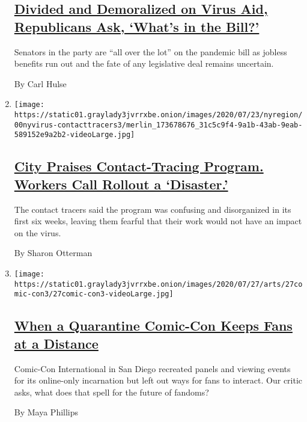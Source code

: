 \begin{enumerate}
{  \subsection{\texorpdfstring{\href{/2020/07/29/us/politics/republicans-congress-virus-aid.html}{Divided
  and Demoralized on Virus Aid, Republicans Ask, `What's in the
  Bill?'}}{Divided and Demoralized on Virus Aid, Republicans Ask, `What's in the Bill?'}}\label{divided-and-demoralized-on-virus-aid-republicans-ask-whats-in-the-bill}}

  Senators in the party are ``all over the lot'' on the pandemic bill as
  jobless benefits run out and the fate of any legislative deal remains
  uncertain.

  By Carl Hulse
\item
  \texttt{[image: https://static01.graylady3jvrrxbe.onion/images/2020/07/23/nyregion/00nyvirus-contacttracers3/merlin\_173678676\_31c5c9f4-9a1b-43ab-9eab-589152e9a2b2-videoLarge.jpg]}

  \hypertarget{city-praises-contact-tracing-program-workers-call-rollout-a-disaster}{%
  \subsection{\texorpdfstring{\href{/2020/07/29/nyregion/new-york-contact-tracing.html}{City
  Praises Contact-Tracing Program. Workers Call Rollout a
  `Disaster.'}}{City Praises Contact-Tracing Program. Workers Call Rollout a `Disaster.'}}\label{city-praises-contact-tracing-program-workers-call-rollout-a-disaster}}

  The contact tracers said the program was confusing and disorganized in
  its first six weeks, leaving them fearful that their work would not
  have an impact on the virus.

  By Sharon Otterman
\item
  \texttt{[image: https://static01.graylady3jvrrxbe.onion/images/2020/07/27/arts/27comic-con3/27comic-con3-videoLarge.jpg]}

  \hypertarget{when-a-quarantine-comic-con-keeps-fans-at-a-distance}{%
  \subsection{\texorpdfstring{\href{/2020/07/29/arts/comic-con-fandom-quarantine.html}{When
  a Quarantine Comic-Con Keeps Fans at a
  Distance}}{When a Quarantine Comic-Con Keeps Fans at a Distance}}\label{when-a-quarantine-comic-con-keeps-fans-at-a-distance}}

  Comic-Con International in San Diego recreated panels and viewing
  events for its online-only incarnation but left out ways for fans to
  interact. Our critic asks, what does that spell for the future of
  fandoms?

  By Maya Phillips
\end{enumerate}

